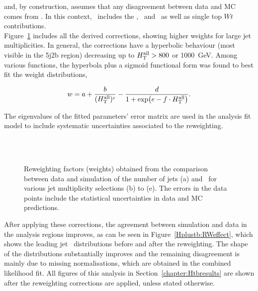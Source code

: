 and, by construction, assumes that any disagreement between data and MC comes from \ttbar. In this context, \ttbar\ includes the \ttb, \ttc\ and \ttl\ as well as single top $Wt$ contributions.\\

Figure~\ref{Hplustb:RWfactors} includes all the derived corrections, showing higher weights for large jet multiplicities. In general, the \HTall corrections have a hyperbolic behaviour (most visible in the 5j2b region) decreasing up to $H_{\text{T}}^{\text{all}} > 800$ or 1000~GeV. Among various functions, the hyperbola plus a sigmoid functional form was found to best fit the weight distributions,

\begin{equation}
w=a+\frac{b}{(H_{\text{T}}^{\text{all}})^c} - \frac{d}{1+\exp(e-f\cdot H_{\text{T}}^{\text{all}})}.
\end{equation}

The eigenvalues of the fitted parameters' error matrix are used in the analysis fit model to include systematic uncertainties associated to the reweighting.\\

\begin{figure}[htb]
    \RawFloats
    \begin{center}
     \\ 
      \\
    \caption{Reweighting factors (weights) obtained from the comparison between data and simulation of the number of jets (a) and \HTall\ for various jet multiplicity selections (b) to (e).
    The errors in the data points include the statistical uncertainties in data and MC predictions.}
    \label{Hplustb:RWfactors}
\end{center}
\end{figure}

After applying these corrections, the agreement between simulation and data in the analysis regions improves, as can be seen in Figure~\ref{Hplustb:RWeffect}, which shows the leading jet \pT\ distributions before and after the reweighting. The shape of the distributions substantially improves and the remaining disagreement is mainly due to missing normalisations, which are obtained in the combined likelihood fit. All figures of this analysis in Section~\ref{chapter:Htbresults} are shown after the reweighting corrections are applied, unless stated otherwise.

